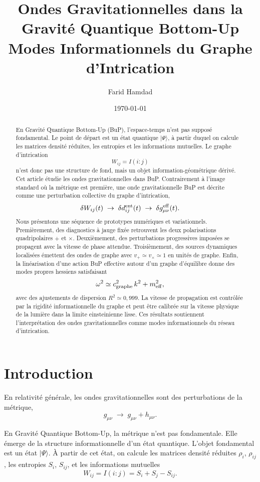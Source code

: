 \documentclass[11pt,a4paper]{article}
\title{
\textbf{Ondes Gravitationnelles dans la Gravité Quantique Bottom-Up}\\
\large Modes Informationnels du Graphe d'Intrication
}
\author{Farid Hamdad}
\date{\today}
\begin{document}
\maketitle

\begin{abstract}
En Gravité Quantique Bottom-Up (BuP), l'espace-temps n'est pas supposé fondamental.
Le point de départ est un état quantique \(|\Psi\rangle\), à partir duquel on calcule
les matrices densité réduites, les entropies et les informations mutuelles. Le
graphe d'intrication
\[
W_{ij} = I(i:j)
\]
n'est donc pas une structure de fond, mais un objet information-géométrique dérivé.
Cet article étudie les ondes gravitationnelles dans BuP. Contrairement à l'image
standard où la métrique est première, une onde gravitationnelle BuP est décrite
comme une perturbation collective du graphe d'intrication,
\[
\delta W_{ij}(t)
\;\rightarrow\;
\delta d_{ij}^{\rm ent}(t)
\;\rightarrow\;
\delta g_{\mu\nu}^{\rm eff}(t).
\]
Nous présentons une séquence de prototypes numériques et variationnels.
Premièrement, des diagnostics à jauge fixée retrouvent les deux polarisations
quadripolaires \(+\) et \(\times\). Deuxièmement, des perturbations progressives
imposées se propagent avec la vitesse de phase attendue. Troisièmement, des
sources dynamiques localisées émettent des ondes de graphe avec
\(v_+ \simeq v_\times \simeq 1\) en unités de graphe. Enfin, la linéarisation d'une
action BuP effective autour d'un graphe d'équilibre donne des modes propres hessiens
satisfaisant
\[
\omega^2 \simeq c_{\rm graphe}^2 \, k^2 + m_{\rm eff}^2,
\]
avec des ajustements de dispersion \(R^2 \simeq 0{,}999\). La vitesse de propagation
est contrôlée par la rigidité informationnelle du graphe et peut être calibrée
sur la vitesse physique de la lumière dans la limite einsteinienne lisse.
Ces résultats soutiennent l'interprétation des ondes gravitationnelles comme
modes informationnels du réseau d'intrication.
\end{abstract}

\section{Introduction}

En relativité générale, les ondes gravitationnelles sont des perturbations de la
métrique,
\[
g_{\mu\nu} \;\rightarrow\; g_{\mu\nu} + h_{\mu\nu}.
\]

En Gravité Quantique Bottom-Up, la métrique n'est pas fondamentale. Elle émerge
de la structure informationnelle d'un état quantique. L'objet fondamental est un
état \(|\Psi\rangle\). À partir de cet état, on calcule les matrices densité
réduites \(\rho_i\), \(\rho_{ij}\), les entropies \(S_i\), \(S_{ij}\), et les
informations mutuelles
\[
W_{ij} = I(i:j) = S_i + S_j - S_{ij}.
\]
\end{document}
